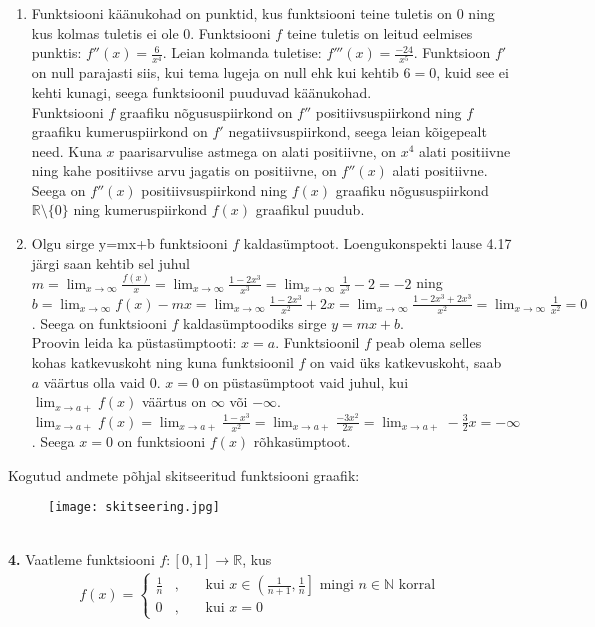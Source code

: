 \documentclass{article}
\begin{document}
\begin{enumerate}
	\item Funktsiooni k\"a\"anukohad on punktid, kus funktsiooni teine tuletis on 0 ning kus kolmas tuletis ei ole 0. Funktsiooni $f$ teine tuletis on leitud eelmises punktis: $f''(x)=\displaystyle\frac{6}{x^4}$. Leian kolmanda tuletise: $f'''(x)=\displaystyle\frac{-24}{x^5}$. Funktsioon $f'$ on null parajasti siis, kui tema lugeja on null ehk kui kehtib $6=0$, kuid see ei kehti kunagi, seega funktsioonil puuduvad k\"a\"anukohad.\\
	Funktsiooni $f$ graafiku n\~ogususpiirkond on $f''$ positiivsuspiirkond ning $f$ graafiku kumeruspiirkond on $f'$ negatiivsuspiirkond, seega leian k\~oigepealt need. Kuna $x$ paarisarvulise astmega on alati positiivne, on $x^4$ alati positiivne ning kahe positiivse arvu jagatis on positiivne, on $f''(x)$ alati positiivne. Seega on $f''(x)$ positiivsuspiirkond ning $f(x)$ graafiku n\~ogususpiirkond $\mathbb{R}\setminus\{0\}$ ning kumeruspiirkond $f(x)$ graafikul puudub.
	\item Olgu sirge y=mx+b funktsiooni $f$ kaldas\"umptoot. Loengukonspekti lause 4.17 j\"argi saan kehtib sel juhul $m=\displaystyle\lim_{x\to\infty}\frac{f(x)}{x}=\lim_{x\to\infty}\frac{1-2x^3}{x^3}=\lim_{x\to\infty}\frac{1}{x^3}-2=-2$ ning $b=\displaystyle\lim_{x\to\infty}f(x)-mx=\lim_{x\to\infty}\frac{1-2x^3}{x^2}+2x=\lim_{x\to\infty}\frac{1-2x^3+2x^3}{x^2}=\lim_{x\to\infty}\frac{1}{x^2}=0$. Seega on funktsiooni $f$ kaldas\"umptoodiks sirge $y=mx+b$.\\
	Proovin leida ka p\"ustas\"umptooti: $x=a$. Funktsioonil $f$ peab olema selles kohas katkevuskoht ning kuna funktsioonil $f$ on vaid \"uks katkevuskoht, saab $a$ v\"a\"artus olla vaid 0. $x=0$ on p\"ustas\"umptoot vaid juhul, kui $\displaystyle\lim_{x\to a+} f(x)$ v\"a\"artus on $\infty$ v\~oi $-\infty$. $\displaystyle\lim_{x\to a+} f(x)=\lim_{x\to a+}\frac{1-x^3}{x^2}=\lim_{x\to a+}\frac{-3x^2}{2x}=\lim_{x\to a+}-\frac{3}{2}x=-\infty$. Seega $x=0$ on funktsiooni $f(x)$ r\~ohkas\"umptoot.
\end {enumerate}
Kogutud andmete p\~ohjal skitseeritud funktsiooni graafik:
\begin{figure}[htbp]
\hspace{4cm}
\texttt{[image: skitseering.jpg]}
\end{figure}
\pagebreak\\
\textbf{4.} Vaatleme funktsiooni $f:[0,1]\to\mathbb{R}$, kus
\begin{equation*}
\begin{aligned}
f(x)=\left\{
\begin{aligned}
\frac{1}{n}&,&&\text{ kui }x\in\left(\frac{1}{n+1},\frac{1}{n}\right] \text{ mingi } n\in\mathbb{N} \text{ korral}\\
0&,&&\text{ kui }x=0
\end{aligned}
\right.
\end{aligned}
\end{equation*}
\end{document}
